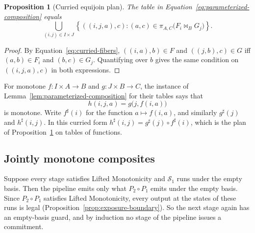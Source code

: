 \documentclass[sigconf]{cidr-2027}
\newtheorem{proposition}{Proposition}
\theoremstyle{remark}
\newcommand{\commitment}{commitment\xspace}
\newcommand{\Spec}{\mathcal{S}}
\begin{document}
\begin{proposition}[Curried equijoin plan]
\label{prop:curried-query-plan}
The table in Equation~\ref{eq:parameterized-composition} equals
\begin{equation}
  \bigcup_{(i,j)\in I\times J}
  \left\{((i,j,a),c):
    (a,c)\in\pi_{A,C}\bigl(F_i\Join_B G_j\bigr)\right\}.
  \label{eq:curried-query-plan}
\end{equation}
\end{proposition}

\begin{proof}
By Equation~\ref{eq:curried-fibers}, $((i,a),b)\in F$ and $((j,b),c)\in G$
iff $(a,b)\in F_i$ and $(b,c)\in G_j$. Quantifying over $b$ gives the same
condition on $((i,j,a),c)$ in both expressions.
\end{proof}

For monotone $f:I\times A\to B$ and $g:J\times B\to C$, the instance of
Lemma~\ref{lem:parameterized-composition} for their tables says that
\begin{equation}
  h(i,j,a)=g\bigl(j,f(i,a)\bigr)
  \label{eq:curried-composition}
\end{equation}
\textcolor{reviewed}{is monotone.} Write $f^\sharp(i)$ for the function $a\mapsto f(i,a)$, and
similarly $g^\sharp(j)$ and $h^\sharp(i,j)$. In this curried form
$h^\sharp(i,j)=g^\sharp(j)\circ f^\sharp(i)$, which is the plan of
Proposition~\ref{prop:curried-query-plan} on tables of functions.

\subsection{Jointly monotone composites}

Suppose every stage satisfies Lifted Monotonicity and $\Spec_1$ runs under
the empty basis. Then the pipeline emits only what $P_2\circ P_1$ emits under
the empty basis. Since $P_2\circ P_1$ satisfies Lifted Monotonicity, every
output at the states of these runs is legal
(Proposition~\ref{prop:exposure-boundary}). So the next stage again has an
empty-basis guard, and by induction no stage of the pipeline issues a
\commitment.
\end{document}
